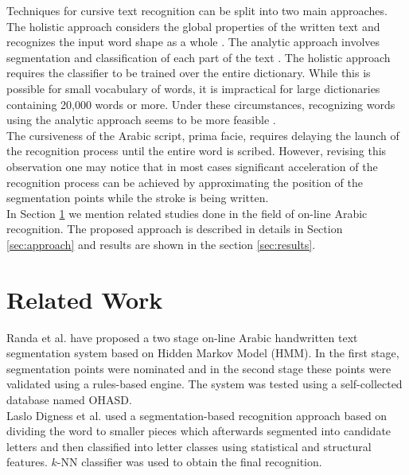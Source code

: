 \documentclass[10pt, conference, compsocconf]{IEEEtran}
\begin{document}
Techniques for cursive text recognition can be split into two main approaches. 
The holistic approach considers the global properties of the written text and recognizes the input word shape as a whole \cite{biadsy2011segmentation, saabni2009hierarchical}. 
The analytic approach involves segmentation and classification of each part of the text \cite{abdulla2008off, sari2002off, Dinges2011}. 
The holistic approach requires the classifier to be trained over the entire dictionary. 
While this is possible for small vocabulary of words, it is impractical for large dictionaries containing 20,000 words or more. 
Under these circumstances, recognizing words using the analytic approach seems to be more feasible \cite{elanwar2012unconstrained}.\\

The cursiveness of the Arabic script, prima facie, requires delaying the launch of the recognition process until the entire word is scribed. 
However, revising this observation one may notice that in most cases significant acceleration of the recognition process can be achieved by approximating the position of the segmentation points while the stroke is being written.\\

In Section \ref{sec:related_work} we mention related studies done in the field of on-line Arabic recognition. 
The proposed approach is described in details in Section \ref{sec:approach} and results are shown in the section \ref{sec:results}. 

\section{Related Work}
\label{sec:related_work}

Randa et al. \cite{elanwar2012unconstrained} have proposed a two stage on-line Arabic handwritten text segmentation system based on Hidden Markov Model (HMM). 
In the first stage, segmentation points were nominated and in the second stage these points were validated using a rules-based engine. 
The system was tested using a self-collected database named OHASD.\\

Laslo Digness et al. \cite{Dinges2011} used a segmentation-based recognition approach based on dividing the word to smaller pieces which afterwards segmented into candidate letters and then classified into letter classes using statistical and structural features. 
$k$-NN classifier was used to obtain the final recognition.\\
\end{document}
